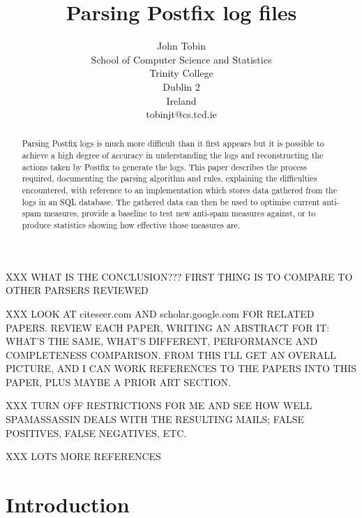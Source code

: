 \documentclass[a4paper,12pt,draft]{article}
\begin{document}
\title{Parsing Postfix log files}
\author{John Tobin \\ School of Computer Science and Statistics \\ 
Trinity College \\ Dublin 2 \\ Ireland \\ tobinjt@cs.tcd.ie}
\date{}
\maketitle

\begin{abstract}

    Parsing Postfix logs is much more difficult than it first appears but
    it is possible to achieve a high degree of accuracy in understanding
    the logs and reconstructing the actions taken by Postfix to generate
    the logs.  This paper describes the process required, documenting the
    parsing algorithm and rules, explaining the difficulties encountered,
    with reference to an implementation which stores data gathered from the
    logs in an SQL database.  The gathered data can then be used to
    optimise current anti-spam measures, provide a baseline to test new
    anti-spam measures against, or to produce statistics showing how
    effective those measures are.

\end{abstract}

XXX WHAT IS THE CONCLUSION???  FIRST THING IS TO COMPARE TO OTHER PARSERS
REVIEWED

XXX LOOK AT citeseer.com AND scholar.google.com FOR RELATED PAPERS\@.
REVIEW EACH PAPER, WRITING AN ABSTRACT FOR IT\@: WHAT'S THE SAME, WHAT'S
DIFFERENT, PERFORMANCE AND \newline COMPLETENESS COMPARISON\@.  FROM THIS
I'LL GET AN OVERALL PICTURE, AND I CAN WORK REFERENCES TO THE PAPERS INTO
THIS PAPER, PLUS MAYBE A PRIOR ART SECTION\@.

XXX TURN OFF RESTRICTIONS FOR ME AND SEE HOW WELL SPAMASSASSIN DEALS WITH
THE RESULTING MAILS\@; FALSE POSITIVES, FALSE NEGATIVES, ETC\@.

XXX LOTS MORE REFERENCES

\newpage
\tableofcontents

\newpage
\section{Introduction}

\label{introduction}
\end{document}
